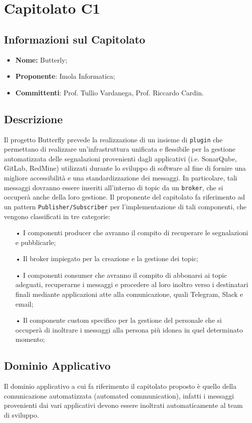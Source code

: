 \section{Capitolato C1}
\subsection{Informazioni sul Capitolato}
\begin{itemize}
	\item \textbf{Nome:} Butterly;
	\item \textbf{Proponente}: Imola Informatica;
	\item \textbf{Committenti}: Prof. Tullio Vardanega, Prof. Riccardo Cardin.
\end{itemize}

\subsection{Descrizione}
Il progetto Butterfly prevede la realizzazione di un insieme di \texttt{plugin} che permettano di realizzare un'infrastruttura unificata e flessibile per la gestione automatizzata delle segnalazioni provenienti dagli applicativi (i.e. SonarQube, GitLab, RedMine) utilizzati durante lo sviluppo di software al fine di fornire una migliore accessibilità e una standardizzazione dei messaggi. In particolare, tali messaggi dovranno essere inseriti all'interno di topic da un \texttt{broker}, che si occuperà anche della loro gestione. Il proponente del capitolato fa riferimento ad un pattern \texttt{Publisher/Subscriber} per l'implementazione di tali componenti, che vengono classificati in tre categorie:
\begin{itemize}
\item[•]I componenti producer che avranno il compito di recuperare le segnalazioni e pubblicarle;
\item[•]Il broker impiegato per la creazione e la gestione dei topic;
\item[•]I componenti consumer che avranno il compito di abbonarsi ai topic adeguati, recuperarne i messaggi e procedere al loro inoltro verso i destinatari finali mediante applicazioni atte alla comunicazione, quali Telegram, Slack e email;
\item[•]Il componente custom specifico per la gestione del personale che si occuperà di inoltrare i messaggi alla persona più idonea in quel determinato momento;
\end{itemize}
\subsection{Dominio Applicativo}
Il dominio applicativo a cui fa riferimento il capitolato proposto è quello della comunicazione automatizzata (automated communication), infatti i messaggi provenienti dai vari applicativi devono essere inoltrati automaticamente al team di sviluppo.
